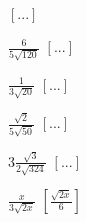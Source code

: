 \begin{esercizio}[\Ast]
\begin{multicols}{4}
\begin{enumeratea}
  \hfill \(\left[...\right]\)
 \item \(\frac 6{5\sqrt{120}}\)
  \hfill \(\left[...\right]\)
 \item \(\frac 1{3\sqrt{20}}\)
  \hfill \(\left[...\right]\)
 \item \(\frac{\sqrt 2}{5\sqrt{50}}\)
  \hfill \(\left[...\right]\)
 \item \(3\frac{\sqrt 3}{2\sqrt{324}}\)
  \hfill \(\left[...\right]\)
 \item \(\frac x{3\sqrt{2x}}\)
  \hfill \(\left[\frac{\sqrt{2x}} 6\right]\)
 \end{enumeratea}
 \end{multicols}
\end{esercizio}

\newpage %


